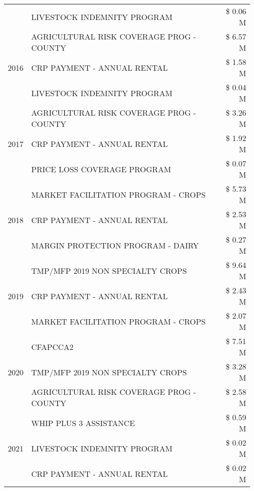 \begin{tabular}{llr}
 & LIVESTOCK INDEMNITY PROGRAM & \$ 0.06 M \\
\cline{1-3}
\multirow[t]{3}{*}{2016} & AGRICULTURAL RISK COVERAGE PROG - COUNTY & \$ 6.57 M \\
 & CRP PAYMENT - ANNUAL RENTAL & \$ 1.58 M \\
 & LIVESTOCK INDEMNITY PROGRAM & \$ 0.04 M \\
\cline{1-3}
\multirow[t]{3}{*}{2017} & AGRICULTURAL RISK COVERAGE PROG - COUNTY & \$ 3.26 M \\
 & CRP PAYMENT - ANNUAL RENTAL & \$ 1.92 M \\
 & PRICE LOSS COVERAGE PROGRAM & \$ 0.07 M \\
\cline{1-3}
\multirow[t]{3}{*}{2018} & MARKET FACILITATION PROGRAM - CROPS & \$ 5.73 M \\
 & CRP PAYMENT - ANNUAL RENTAL & \$ 2.53 M \\
 & MARGIN PROTECTION PROGRAM - DAIRY & \$ 0.27 M \\
\cline{1-3}
\multirow[t]{3}{*}{2019} & TMP/MFP 2019 NON SPECIALTY CROPS & \$ 9.64 M \\
 & CRP PAYMENT - ANNUAL RENTAL & \$ 2.43 M \\
 & MARKET FACILITATION PROGRAM - CROPS & \$ 2.07 M \\
\cline{1-3}
\multirow[t]{3}{*}{2020} & CFAPCCA2 & \$ 7.51 M \\
 & TMP/MFP 2019 NON SPECIALTY CROPS & \$ 3.28 M \\
 & AGRICULTURAL RISK COVERAGE PROG - COUNTY & \$ 2.58 M \\
\cline{1-3}
\multirow[t]{3}{*}{2021} & WHIP PLUS 3 ASSISTANCE & \$ 0.59 M \\
 & LIVESTOCK INDEMNITY PROGRAM & \$ 0.02 M \\
 & CRP PAYMENT - ANNUAL RENTAL & \$ 0.02 M \\
\cline{1-3}
\bottomrule
\end{tabular}
